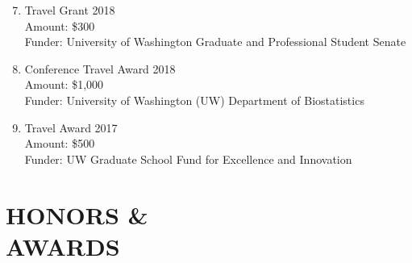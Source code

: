 \documentclass[margin]{res}
\newenvironment{benumerate}[1]{
    \let\oldItem\item
    \def\item{\addtocounter{enumi}{-2}\oldItem}
    
    \begin{enumerate}
    \setcounter{enumi}{#1}
    \addtocounter{enumi}{1}
}{
    \end{enumerate}
}
\begin{document}
\begin{resume}
\begin{benumerate}{6}
\item Travel Grant  \hfill 2018 \\ 
Amount: \$300 \\
Funder: University of Washington Graduate and Professional Student Senate 
\item Conference Travel Award \hfill 2018 \\
Amount: \$1,000 \\
Funder: University of Washington (UW) Department of Biostatistics
\item Travel Award \hfill 2017 \\
Amount: \$500 \\
Funder: UW Graduate School Fund for Excellence and Innovation 
\end{benumerate}





\section{HONORS \& \\ AWARDS}


\end{resume}
\end{document}

